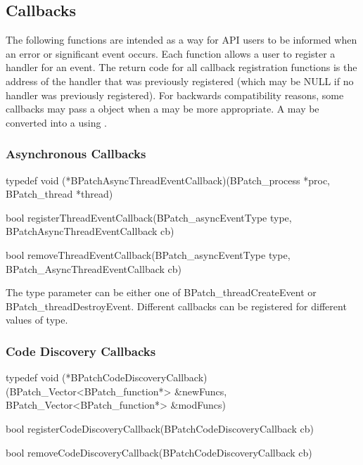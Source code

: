 \subsection{Callbacks}

The following functions are intended as a way for API users to be informed when an error or significant event occurs.
Each function allows a user to register a handler for an event. The return code for all callback registration
functions is the address of the handler that was previously registered (which may be NULL if no handler was previously
registered). For backwards compatibility reasons, some callbacks may pass a  object when a
 may be more appropriate. A  may be converted into a  using
.

\subsubsection{Asynchronous Callbacks}

\begin{apient}
typedef void (*BPatchAsyncThreadEventCallback)(BPatch_process *proc, BPatch_thread *thread)

bool registerThreadEventCallback(BPatch_asyncEventType type, BPatchAsyncThreadEventCallback cb)

bool removeThreadEventCallback(BPatch_asyncEventType type, BPatch_AsyncThreadEventCallback cb)
\end{apient}

\begin{apidesc}
The type parameter can be either one of BPatch_threadCreateEvent or BPatch_threadDestroyEvent. Different callbacks
can be registered for different values of type.
\end{apidesc}

\subsubsection{Code Discovery Callbacks}

\begin{apient}
typedef void (*BPatchCodeDiscoveryCallback)(BPatch_Vector<BPatch_function*> &newFuncs, BPatch_Vector<BPatch_function*> &modFuncs)

bool registerCodeDiscoveryCallback(BPatchCodeDiscoveryCallback cb)

bool removeCodeDiscoveryCallback(BPatchCodeDiscoveryCallback cb)
\end{apient}

